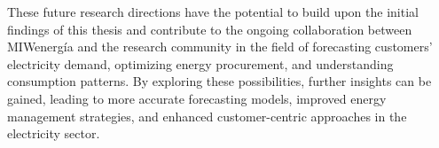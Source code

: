 
These future research directions have the potential to build upon the initial findings of this thesis and contribute to the ongoing collaboration between MIWenergía and the research community in the field of forecasting customers' electricity demand, optimizing energy procurement, and understanding consumption patterns.
By exploring these possibilities, further insights can be gained, leading to more accurate forecasting models, improved energy management strategies, and enhanced customer-centric approaches in the electricity sector.
